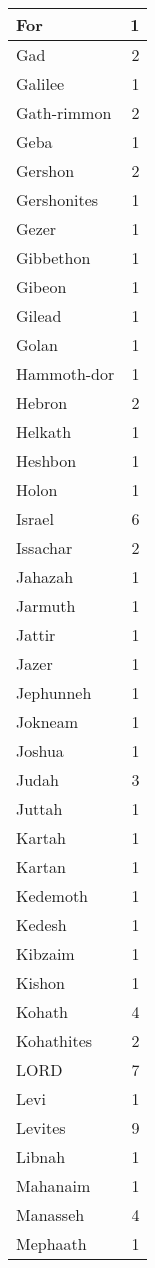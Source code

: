 \begin{center}
\begin{longtable}{l|r}
For & 1\\ \hline 
Gad & 2\\ \hline 
Galilee & 1\\ \hline 
Gath-rimmon & 2\\ \hline 
Geba & 1\\ \hline 
Gershon & 2\\ \hline 
Gershonites & 1\\ \hline 
Gezer & 1\\ \hline 
Gibbethon & 1\\ \hline 
Gibeon & 1\\ \hline 
Gilead & 1\\ \hline 
Golan & 1\\ \hline 
Hammoth-dor & 1\\ \hline 
Hebron & 2\\ \hline 
Helkath & 1\\ \hline 
Heshbon & 1\\ \hline 
Holon & 1\\ \hline 
Israel & 6\\ \hline 
Issachar & 2\\ \hline 
Jahazah & 1\\ \hline 
Jarmuth & 1\\ \hline 
Jattir & 1\\ \hline 
Jazer & 1\\ \hline 
Jephunneh & 1\\ \hline 
Jokneam & 1\\ \hline 
Joshua & 1\\ \hline 
Judah & 3\\ \hline 
Juttah & 1\\ \hline 
Kartah & 1\\ \hline 
Kartan & 1\\ \hline 
Kedemoth & 1\\ \hline 
Kedesh & 1\\ \hline 
Kibzaim & 1\\ \hline 
Kishon & 1\\ \hline 
Kohath & 4\\ \hline 
Kohathites & 2\\ \hline 
LORD & 7\\ \hline 
Levi & 1\\ \hline 
Levites & 9\\ \hline 
Libnah & 1\\ \hline 
Mahanaim & 1\\ \hline 
Manasseh & 4\\ \hline 
Mephaath & 1\\ \hline 

\end{longtable}
\end{center}
